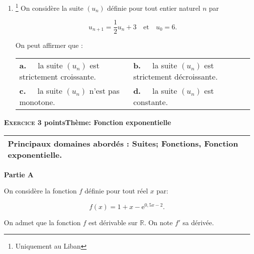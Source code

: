 \documentclass[10pt,a4paper]{article}
\newcommand{\R}{\mathbb{R}}
\begin{document}
\begin{enumerate}[resume]
\item \footnote{Uniquement au Liban} On considère la suite $\left(u_n\right)$ définie pour tout entier naturel $n$ par 

\[u_{n+1} = \dfrac12u_n + 3\quad \text{et}\quad u_0 = 6.\]

On peut affirmer que :

\begin{center}
\begin{tabularx}{\linewidth}{*{2}{X}}
\textbf{a.~~} la suite $\left(u_n\right)$ est strictement croissante.&\textbf{b.~~} la suite $\left(u_n\right)$ est strictement décroissante.\\
\textbf{c.~~} la suite $\left(u_n\right)$ n'est pas monotone. &\textbf{d.~~} la suite $\left(u_n\right)$ est constante.
\end{tabularx}
\end{center}
\end{enumerate}

\bigskip

\textbf{\textsc{Exercice 3}  points\hfill Thème: Fonction exponentielle }

\medskip

\begin{tabularx}{\linewidth}{|X|}\hline
\textbf{Principaux domaines abordés :} Suites;
Fonctions, Fonction exponentielle.\\ \hline
\end{tabularx}

\bigskip

\textbf{Partie A}

\medskip

On considère la fonction $f$ définie pour tout réel $x$ par:

\[ f(x) = 1+x - \text{e}^{0,5x - 2}.\]

On admet que la fonction $f$ est dérivable sur $\R$. On note $f'$ sa dérivée.

\medskip
\end{document}
